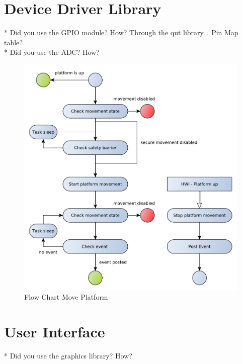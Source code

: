 \section{Device Driver Library} %
* Did you use the GPIO module? How? Through the qut library... Pin Map table?\\
* Did you use the ADC? How? 


\begin{figure}[H]
	\begin{center}
		\includegraphics[scale=.60]{media/Flow_Chart_MovePlatform.pdf} 	
		\caption{Flow Chart Move Platform}
		\label{fig:moveplatform}
	\end{center}
\end{figure}

\section{User Interface} %
* Did you use the graphics library? How?\\




